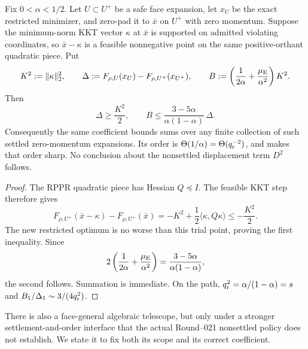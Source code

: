 \begin{lemma}
\label{lem:settled-reset-optimum-drop-bound}
Fix $0<\alpha<1/2$.  Let $U\subset U^+$ be a safe face expansion, let $x_U$
be the exact restricted minimizer, and zero-pad it to $\bar x$ on $U^+$ with
zero momentum.  Suppose the minimum-norm KKT vector $\kappa$ at $\bar x$ is
supported on admitted violating coordinates, so $\bar x-\kappa$ is a feasible
nonnegative point on the same positive-orthant quadratic piece.  Put
\begin{equation*}
 K^2:=\lVert\kappa\rVert_2^2,\qquad
 \Delta:=F_{\rho,U}(x_U)-F_{\rho,U^+}(x_{U^+}),\qquad
 B:=\left(\frac1{2\alpha}+\frac{\mu_{\rm E}}{\alpha^2}\right)K^2.
\end{equation*}
Then
\begin{equation}
 \Delta\geq\frac{K^2}{2},
 \qquad
 B\leq
 \frac{3-5\alpha}{\alpha(1-\alpha)}\,\Delta.
 \label{eq:settled-reset-optimum-drop-bound}
\end{equation}
Consequently the same coefficient bounds sums over any finite collection of
such settled zero-momentum expansions.  Its order is
$\Theta(1/\alpha)=\Theta(q_{\rm r}^{-2})$, and
 makes that order sharp.
No conclusion about the nonsettled displacement term $D^2$ follows.
\end{lemma}

\begin{proof}
The RPPR quadratic piece has Hessian $Q\preceq I$.  The feasible KKT step
therefore gives
\begin{equation*}
 F_{\rho,U^+}(\bar x-\kappa)-F_{\rho,U^+}(\bar x)
 =-K^2+\frac12\langle\kappa,Q\kappa\rangle
 \leq-\frac{K^2}{2}.
\end{equation*}
The new restricted optimum is no worse than this trial point, proving the
first inequality.  Since
\begin{equation*}
 2\left(\frac1{2\alpha}+\frac{\mu_{\rm E}}{\alpha^2}\right)
 =\frac{3-5\alpha}{\alpha(1-\alpha)},
\end{equation*}
the second follows.  Summation is immediate.  On the path,
$q_{\rm r}^2=\alpha/(1-\alpha)=s$ and
$B_1/\Delta_1\sim3/(4q_{\rm r}^2)$.
\end{proof}

There is also a face-general algebraic telescope, but only under a stronger
settlement-and-order interface that the actual Round--021 nonsettled policy
does not establish.  We state it to fix both its scope and its correct
coefficient.

